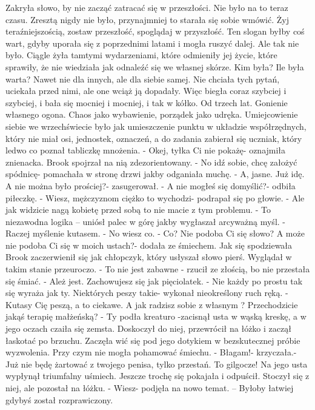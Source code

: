 \documentclass[12pt,a4paper]{book}
\begin{document}
Zakryła słowo, by nie zacząć zatracać się w przeszłości. Nie było na to teraz czasu. Zresztą nigdy nie było, przynajmniej to starała się sobie wmówić. Żyj teraźniejszością, zostaw przeszłość, spoglądaj w przyszłość. Ten slogan byłby coś wart, gdyby uporała się z poprzednimi latami i mogła ruszyć dalej. Ale tak nie było. Ciągle żyła tamtymi wydarzeniami, które odmieniły jej życie, które sprawiły, że nie wiedziała jak odnaleźć się we własnej skórze. Kim była? Ile była warta? Nawet nie dla innych, ale dla siebie samej. Nie chciała tych pytań, uciekała przed nimi, ale one wciąż ją dopadały. Więc biegła coraz szybciej i szybciej, i bała się mocniej i mocniej, i tak w kółko. Od trzech lat. Gonienie własnego ogona. Chaos jako wybawienie, porządek jako udręka. Umiejcowienie siebie we wrzechświecie było jak umieszczenie punktu w układzie współrzędnych, który nie miał
osi, jednostek, oznaczeń, a do zadania zabierał się uczniak, który ledwo co poznał tabliczkę mnożenia. 
- Okej, tyłka Ci nie pokażę- oznajmiła znienacka.
Brook spojrzał na nią zdezorientowany.
- No idź sobie, chcę założyć spódnicę- pomachała w stronę drzwi jakby odganiała muchę. 
- A, jasne. Już idę. A nie można było prościej?- zasugerował. 
- A nie mogłeś się domyślić?- odbiła piłeczkę.
- Wiesz, mężczyznom ciężko to wychodzi- podrapał się po głowie.
- Ale jak widzicie nagą kobietę przed sobą to nie macie z tym problemu.
- To niezawodna logika – uniósł palec w górę jakby wygłaszał arcyważną myśl.
- Raczej myślenie kutasem.
- No wiesz co.
- Co? Nie podoba Ci się słowo? A może nie podoba Ci się w moich ustach?- dodała ze śmiechem. 
Jak się spodziewała Brook zaczerwienił się jak chłopczyk, który usłyszał słowo pierś. Wyglądał w takim stanie przeuroczo.
- To nie jest zabawne - rzucił ze złością, bo nie przestała się śmiać. 
- Ależ jest. Zachowujesz się jak pięciolatek. 
- Nie każdy po prostu tak się wyraża jak ty. Niektórych peszy takie- wykonał nieokreślony ruch ręką. 
- Kutasy Cię peszą, a to ciekawe. A jak radzisz sobie z własnym ? Przechodzicie jakąś terapię małżeńską?
- Ty podła kreaturo -zacisnął usta w wąską kreskę, a w jego oczach czaiła się zemsta. 
Doskoczył do niej, przewrócił na łóżko i zaczął łaskotać po brzuchu. Zaczęła wić się pod jego dotykiem w bezskutecznej próbie wyzwolenia. Przy czym nie mogła pohamować śmiechu. 
- Błagam!- krzyczała.- Już nie będę żartować z twojego penisa, tylko przestań. To gilgocze!
Na jego usta wypłynął triumfalny uśmiech. Jeszcze trochę się pokajała i odpuścił. Stoczył się z niej, ale pozostał na łóżku.
- Wiesz- podjęła na nowo temat. – Byłoby łatwiej gdybyś został rozprawiczony.
\end{document}
